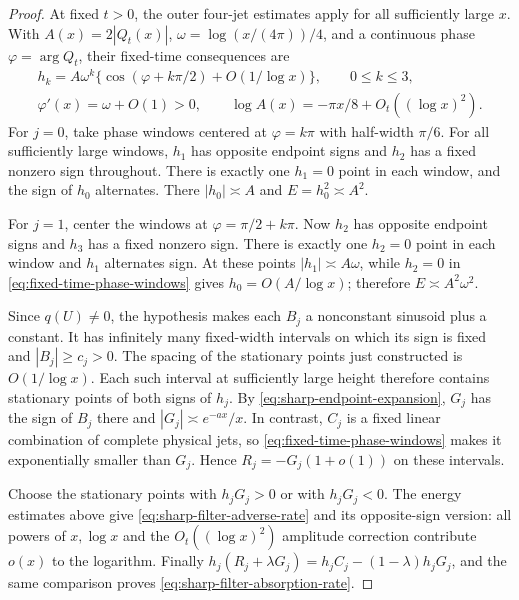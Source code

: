 \documentclass[11pt]{article}
\numberwithin{equation}{section}
\theoremstyle{definition}
\theoremstyle{remark}
\begin{document}
\begin{proof}
At fixed $t>0$, the outer four-jet estimates apply for all sufficiently
large $x$. With $A(x)=2|Q_t(x)|$, $\omega=\log(x/(4\pi))/4$, and
a continuous phase $\varphi=\arg Q_t$, their fixed-time consequences are
\begin{equation}
 \begin{gathered}
 h_k=A\omega^k\{\cos(\varphi+k\pi/2)+O(1/\log x)\},
       \qquad 0\le k\le3,\\
 \varphi'(x)=\omega+O(1)>0,\qquad
 \log A(x)=-\pi x/8+O_t((\log x)^2).
 \end{gathered}
 \label{eq:fixed-time-phase-windows}
\end{equation}
For $j=0$, take phase windows centered at $\varphi=k\pi$ with
half-width $\pi/6$. For all sufficiently large windows, $h_1$ has
opposite endpoint signs and $h_2$ has a fixed nonzero sign throughout.
There is exactly one $h_1=0$ point in each window, and the sign of
$h_0$ alternates. There $|h_0|\asymp A$ and $E=h_0^2\asymp A^2$.

For $j=1$, center the windows at $\varphi=\pi/2+k\pi$. Now $h_2$
has opposite endpoint signs and $h_3$ has a fixed nonzero sign.
There is exactly one $h_2=0$ point in each window and $h_1$ alternates
sign. At these points $|h_1|\asymp A\omega$, while $h_2=0$ in
\eqref{eq:fixed-time-phase-windows} gives $h_0=O(A/\log x)$;
therefore $E\asymp A^2\omega^2$.

Since $q(U)\ne0$, the hypothesis makes each $B_j$ a nonconstant
sinusoid plus a constant. It has infinitely many fixed-width intervals
on which its sign is fixed and $|B_j|\ge c_j>0$. The spacing of the
stationary points just constructed is $O(1/\log x)$. Each such interval
at sufficiently large height therefore contains stationary points of
both signs of $h_j$. By \eqref{eq:sharp-endpoint-expansion}, $G_j$
has the sign of $B_j$ there and $|G_j|\asymp e^{-ax}/x$.
In contrast, $C_j$ is a fixed linear combination of complete physical
jets, so \eqref{eq:fixed-time-phase-windows} makes it exponentially
smaller than $G_j$. Hence $R_j=-G_j(1+o(1))$ on these intervals.

Choose the stationary points with $h_jG_j>0$ or with $h_jG_j<0$.
The energy estimates above give \eqref{eq:sharp-filter-adverse-rate}
and its opposite-sign version: all powers of $x,\log x$ and the
$O_t((\log x)^2)$ amplitude correction contribute $o(x)$ to the
logarithm. Finally
$h_j(R_j+\lambda G_j)=h_jC_j-(1-\lambda)h_jG_j$, and the same
comparison proves \eqref{eq:sharp-filter-absorption-rate}.
\end{proof}
\end{document}
